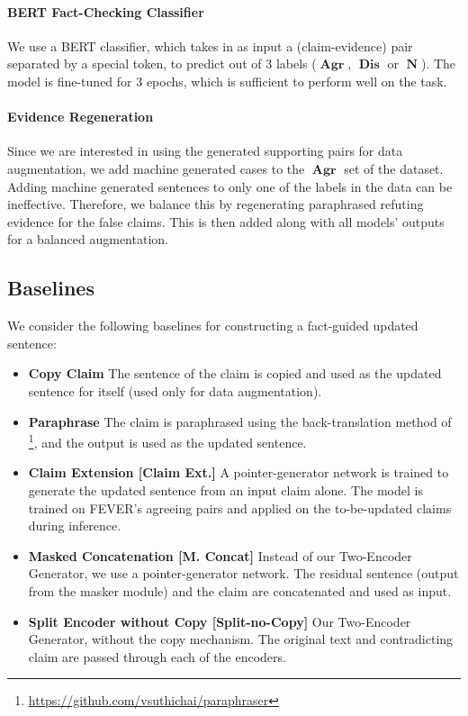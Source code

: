 \documentclass[letterpaper]{article} %
\DeclareMathOperator{\A}{\boldsymbol{Agr}}
\DeclareMathOperator{\D}{\boldsymbol{Dis}}
\DeclareMathOperator{\N}{\boldsymbol{N}}
\begin{document}
\paragraph{BERT Fact-Checking Classifier}
We use a BERT \cite{devlin2018bert} classifier, which takes in as input a (claim-evidence) pair separated by a special token, to predict out of 3 labels ($\A$, $\D$ or $\N$). The model is fine-tuned for 3 epochs, which is sufficient to perform well on the task.

\paragraph{Evidence Regeneration}
Since we are interested in using the generated supporting pairs for data augmentation, we add machine generated cases to the $\A$ set of the dataset. Adding machine generated sentences to only one of the labels in the data can be ineffective. Therefore, we balance this by regenerating paraphrased refuting evidence for the false claims. This is then added along with all models' outputs for a balanced augmentation.





\subsection{Baselines}
We consider the following baselines for constructing a fact-guided updated sentence:

\begin{itemize}
\item \textbf{Copy Claim} The sentence of the claim is copied and used as the updated sentence for itself (used only for data augmentation).

\item \textbf{Paraphrase} The claim is paraphrased using the back-translation method of \cite{wieting-gimpel-2018-paranmt}\footnote{\url{https://github.com/vsuthichai/paraphraser}}, and the output is used as the updated sentence.

\item \textbf{Claim Extension [Claim Ext.]} A pointer-generator network is trained to generate the updated sentence from an input claim alone. The model is trained on FEVER's agreeing pairs and applied on the to-be-updated claims during inference.

\item \textbf{Masked Concatenation [M. Concat]} Instead of our Two-Encoder Generator, we use a pointer-generator network.
The residual sentence (output from the masker module) and the claim are concatenated and used as input.

\item \textbf{Split Encoder without Copy [Split-no-Copy]} Our Two-Encoder Generator, without the copy mechanism. The original text and contradicting claim are passed through each of the encoders.



\end{itemize}
\end{document}
